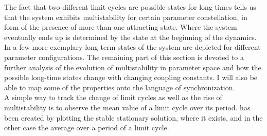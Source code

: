 The fact that two different limit cycles are possible states for long times tells us that the system exhibits multistability for certain parameter constellation, in form of the presence of more than one attracting state. Where the system eventually ends up is determined by the state at the beginning of the dynamics. In  a few more exemplary long term states of the system are depicted for different parameter configurations.\newpage
The remaining part of this section is devoted to a further analysis of the evolution of multistability in parameter space and how the possible long-time states change with changing coupling constants. I will also be able to map some of the properties onto the language of synchronization.\\
A simple way to track the change of limit cycles as well as the rise of multistability is to observe the mean value of a limit cycle over its period.
 has been created by plotting the stable stationary solution, where it exists, and in the other case the average over a period of a limit cycle.





